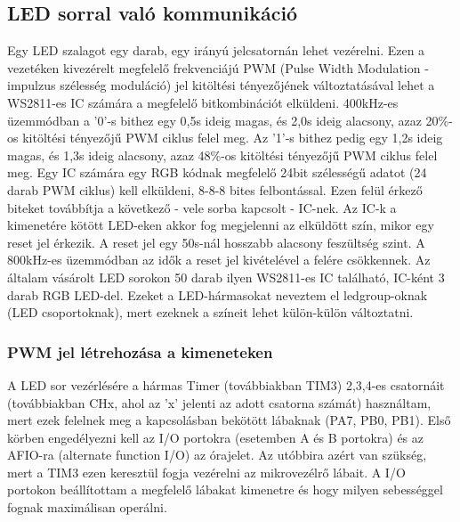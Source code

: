\documentclass[../main.tex]{subfiles}
\begin{document}
    \subsection{LED sorral való kommunikáció}
        Egy LED szalagot egy darab, egy irányú jelcsatornán lehet vezérelni. Ezen a vezetéken kivezérelt megfelelő frekvenciájú PWM (Pulse Width Modulation - impulzus szélesség moduláció) jel kitöltési tényezőjének változtatásával lehet a WS2811-es IC számára a megfelelő bitkombinációt elküldeni. 400kHz-es üzemmódban a '0'-s bithez egy 0,5\micro s ideig magas, és 2,0\micro s ideig alacsony, azaz 20\%-os kitöltési tényezőjű PWM ciklus felel meg. Az '1'-s bithez pedig egy 1,2\micro s ideig magas, és 1,3\micro s ideig alacsony, azaz 48\%-os kitöltési tényezőjű PWM ciklus felel meg. Egy IC számára egy RGB kódnak megfelelő 24bit szélességű adatot (24 darab PWM ciklus) kell elküldeni, 8-8-8 bites felbontással. Ezen felül érkező biteket továbbítja a következő - vele sorba kapcsolt - IC-nek. Az IC-k a kimenetére kötött LED-eken akkor fog megjelenni az elküldött szín, mikor egy reset jel érkezik. A reset jel egy 50\micro s-nál hosszabb alacsony feszültség szint. A 800kHz-es üzemmódban az idők a reset jel kivételével a felére csökkennek. Az általam vásárolt LED sorokon 50 darab ilyen WS2811-es IC található, IC-ként 3 darab RGB LED-del. Ezeket a LED-hármasokat neveztem el ledgroup-oknak (LED csoportoknak), mert ezeknek a színeit lehet külön-külön változtatni. \cite{ds_ws2811}
        
        \subsubsection{PWM jel létrehozása a kimeneteken}
            A LED sor vezérlésére a hármas Timer (továbbiakban TIM3) 2,3,4-es csatornáit (továbbiakban CHx, ahol az 'x' jelenti az adott csatorna számát) használtam, mert ezek felelnek meg a kapcsolásban bekötött lábaknak (PA7, PB0, PB1). Első körben engedélyezni kell az I/O portokra (esetemben A és B portokra) és az AFIO-ra (alternate function I/O) az órajelet. Az utóbbira azért van szükség, mert a TIM3 ezen keresztül fogja vezérelni az mikrovezélrő lábait. A I/O portokon beállítottam a megfelelő lábakat kimenetre és hogy milyen sebességgel fognak maximálisan operálni.
            
\end{document}
